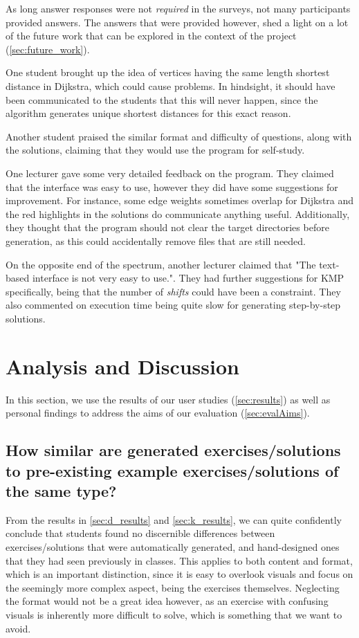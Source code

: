 \documentclass{l4proj}
\begin{document}
As long answer responses were not \emph{required} in the surveys, not many participants provided answers. The answers that were provided however, shed a light on a lot of the future work that can be explored in the context of the project (\autoref{sec:future_work}).

One student brought up the idea of vertices having the same length shortest distance in Dijkstra, which could cause problems. In hindsight, it should have been communicated to the students that this will never happen, since the algorithm generates unique shortest distances for this exact reason. 

Another student praised the similar format and difficulty of questions, along with the solutions, claiming that they would use the program for self-study.

One lecturer gave some very detailed feedback on the program. They claimed that the interface was easy to use, however they did have some suggestions for improvement. For instance, some edge weights sometimes overlap for Dijkstra and the red highlights in the solutions do communicate anything useful. Additionally, they thought that the program should not clear the target directories before generation, as this could accidentally remove files that are still needed.

On the opposite end of the spectrum, another lecturer claimed that "The text-based interface is not very easy to use.". They had further suggestions for KMP specifically, being that the number of \emph{shifts} could have been a constraint. They also commented on execution time being quite slow for generating step-by-step solutions.

\section{Analysis and Discussion}
\label{sec:analysis}

In this section, we use the results of our user studies (\autoref{sec:results}) as well as personal findings to address the aims of our evaluation (\autoref{sec:evalAims}).

\subsection{How similar are generated exercises/solutions to pre-existing example exercises/solutions of the same type?}

From the results in \autoref{sec:d_results} and \autoref{sec:k_results}, we can quite confidently conclude that students found no discernible differences between exercises/solutions that were automatically generated, and hand-designed ones that they had seen previously in classes. This applies to both content and format, which is an important distinction, since it is easy to overlook visuals and focus on the seemingly more complex aspect, being the exercises themselves. Neglecting the format would not be a great idea however, as an exercise with confusing visuals is inherently more difficult to solve, which is something that we want to avoid.
\end{document}
